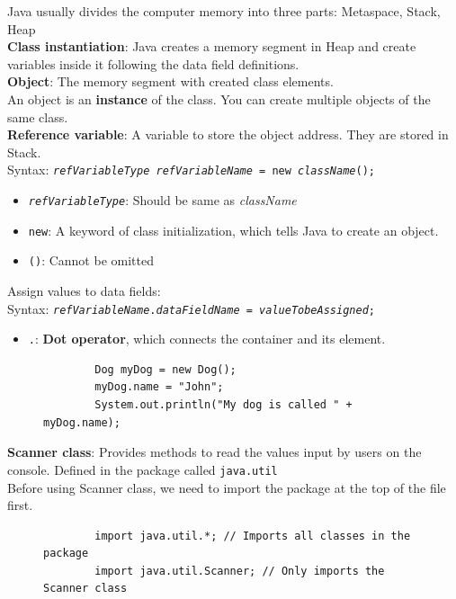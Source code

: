 \documentclass{article}
\begin{document}
Java usually divides the computer memory into three parts: Metaspace, Stack, Heap\\
\textbf{Class instantiation}: Java creates a memory segment in Heap and create variables inside it following the data field definitions.\\
\textbf{Object}: The memory segment with created class elements.\\
An object is an \textbf{instance} of the class. You can create multiple objects of the same class.\\
\textbf{Reference variable}: A variable to store the object address. They are stored in Stack.\\
Syntax: \texttt{\textit{refVariableType} \textit{refVariableName} = new \textit{className}();}
\begin{itemize}
	\item \texttt{\textit{refVariableType}}: Should be same as \textit{className}
	\item \texttt{new}: A keyword of class initialization, which tells Java to create an object.
	\item \texttt{()}: Cannot be omitted
\end{itemize}
Assign values to data fields:\\
Syntax: \texttt{\textit{refVariableName}.\textit{dataFieldName} = \textit{valueTobeAssigned};}
\begin{itemize}
	\item \texttt{.}: \textbf{Dot operator}, which connects the container and its element.
\end{itemize}

\begin{figure}[h!]
	\centering
	\begin{verbatim}
		Dog myDog = new Dog();
		myDog.name = "John";
		System.out.println("My dog is called " + myDog.name);
	\end{verbatim}
\end{figure}
\newpage

\textbf{Scanner class}: Provides methods to read the values input by users on the console. Defined in the package called \texttt{java.util}\\
Before using Scanner class, we need to import the package at the top of the file first.

\begin{figure}[h!]
	\centering
	\begin{verbatim}
		import java.util.*; // Imports all classes in the package
		import java.util.Scanner; // Only imports the Scanner class
	\end{verbatim}
\end{figure}
\end{document}
